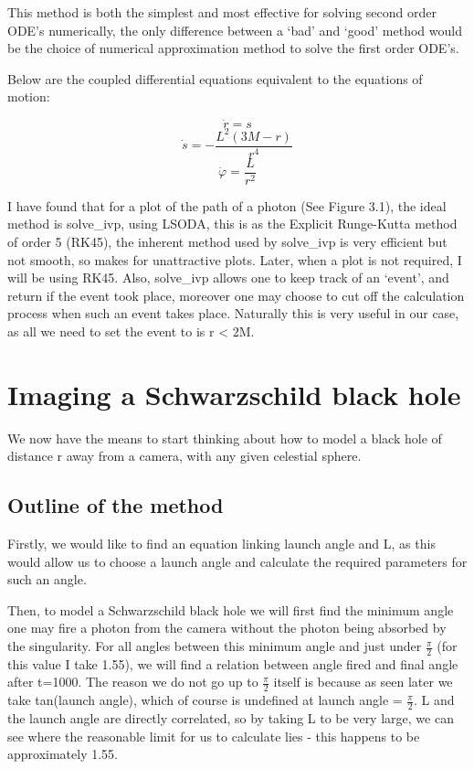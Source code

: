 \documentclass[oneside,openright,frontopenright]{dmathesis}
\begin{document}
	This method is both the simplest and most effective for solving second order ODE’s numerically, the only difference between a ‘bad’ and ‘good’ method would be the choice of numerical approximation method to solve the first order ODE’s.

	Below are the coupled differential equations equivalent to the equations of motion:

	\[\dot{r}= s\]
	\[\dot{s}=-\frac{L^2(3M-r)}{r^4}\]
	\[\dot{\varphi}=\frac{L}{r^2}\]

	I have found that for a plot of the path of a photon (See Figure 3.1), the ideal method is solve\_ivp\cite{2020SciPy-NMeth}, using LSODA\cite{hindmarsh2005lsoda}, this is as the Explicit Runge-Kutta method of order 5 (RK45)\cite{fehlberg1969low}, the inherent method used by solve\_ivp is very efficient but not smooth, so makes for unattractive plots. Later, when a plot is not required, I will be using RK45. Also, solve\_ivp allows one to keep track of an ‘event’, and return if the event took place, moreover one may choose to cut off the calculation process when such an event takes place. Naturally this is very useful in our case, as all we need to set the event to is r < 2M.


\chapter{Imaging a Schwarzschild black hole}

	We now have the means to start thinking about how to model a black hole of distance r away from a camera, with any given celestial sphere.

\section{Outline of the method}

	Firstly, we would like to find an equation linking launch angle and L, as this would allow us to choose a launch angle and calculate the required parameters for such an angle.

	Then, to model a Schwarzschild black hole we will first find the minimum angle one may fire a photon from the camera without the photon being absorbed by the singularity. For all angles between this minimum angle and just under $\frac{\pi}{2}$ (for this value I take 1.55), we will find a relation between angle fired and final angle after t=1000. The reason we do not go up to $\frac{\pi}{2}$ itself is because as seen later we take tan(launch angle), which of course is undefined at launch angle = $\frac{\pi}{2}$. L and the launch angle are directly correlated, so by taking L to be very large, we can see where the reasonable limit for us to calculate lies - this happens to be approximately 1.55.
\end{document}
